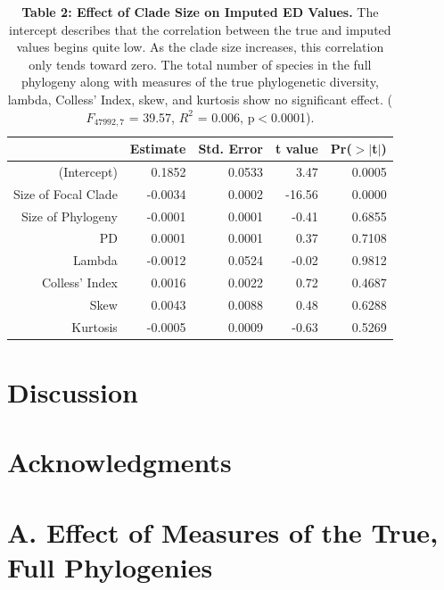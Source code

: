 \documentclass[12pt,english]{article}
\begin{document}
\begin{table}[ht] 
\centering
\begin{tabular}{rrrrr}
  \hline
  & Estimate & Std. Error & t value & Pr($>$$|$t$|$) \\
   \hline
 (Intercept) & 0.1852 & 0.0533 & 3.47 & 0.0005 \\
   Size of Focal Clade& -0.0034 & 0.0002 & -16.56 & 0.0000 \\
   Size of Phylogeny& -0.0001 & 0.0001 & -0.41 & 0.6855 \\
   PD & 0.0001 & 0.0001 & 0.37 & 0.7108 \\
   Lambda & -0.0012 & 0.0524 & -0.02 & 0.9812 \\
   Colless' Index & 0.0016 & 0.0022 & 0.72 & 0.4687 \\
   Skew & 0.0043 & 0.0088 & 0.48 & 0.6288 \\
   Kurtosis & -0.0005 & 0.0009 & -0.63 & 0.5269 \\
   \hline
   \hline
\end{tabular}
\caption*{\textbf{Table 2: Effect of Clade Size on Imputed ED Values.} The 
intercept describes that the correlation between the true and imputed values 
begins quite low. As the clade size increases, this correlation only tends
toward zero. The total number of species in the full phylogeny along with 
measures of the true phylogenetic diversity, lambda, Colless' Index, skew, and kurtosis
show no significant effect. ($F_{47992, 7}$ = 39.57, $R^{2}$ = 0.006, p$<$0.0001).}
\label{imputationModel}
\end{table}

\clearpage
\section*{Discussion}

\section*{Acknowledgments}

\clearpage
\printbibliography

\clearpage
\appendix
\section*{A. Effect of Measures of the True, Full Phylogenies}
\end{document}
